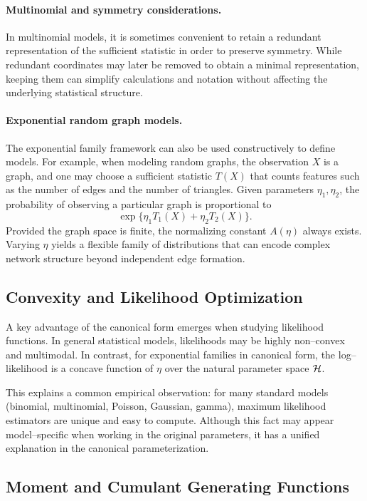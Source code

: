 \paragraph{Multinomial and symmetry considerations.}
In multinomial models, it is sometimes convenient to retain a redundant representation of
the sufficient statistic in order to preserve symmetry.
While redundant coordinates may later be removed to obtain a minimal representation,
keeping them can simplify calculations and notation without affecting the underlying
statistical structure.

\paragraph{Exponential random graph models.}
The exponential family framework can also be used constructively to define models.
For example, when modeling random graphs, the observation \(X\) is a graph, and one may
choose a sufficient statistic \(T(X)\) that counts features such as the number of edges
and the number of triangles.
Given parameters \(\eta_1,\eta_2\), the probability of observing a particular graph is
proportional to
\[
    \exp\{\eta_1 T_1(X) + \eta_2 T_2(X)\}.
\]
Provided the graph space is finite, the normalizing constant \(A(\eta)\) always exists.
Varying \(\eta\) yields a flexible family of distributions that can encode complex
network structure beyond independent edge formation.

\subsection*{Convexity and Likelihood Optimization}

A key advantage of the canonical form emerges when studying likelihood functions.
In general statistical models, likelihoods may be highly non--convex and multimodal.
In contrast, for exponential families in canonical form, the log--likelihood is a concave
function of \(\eta\) over the natural parameter space \(\mathcal{H}\).

This explains a common empirical observation:
for many standard models (binomial, multinomial, Poisson, Gaussian, gamma),
maximum likelihood estimators are unique and easy to compute.
Although this fact may appear model--specific when working in the original parameters,
it has a unified explanation in the canonical parameterization.

\subsection*{Moment and Cumulant Generating Functions}

